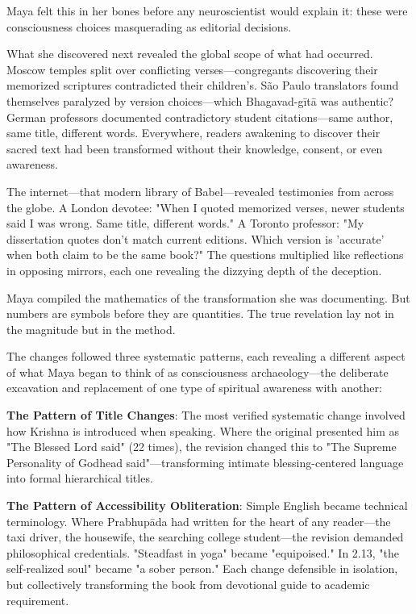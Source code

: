 \documentclass[12pt,twoside]{book}
\begin{document}
Maya felt this in her bones before any neuroscientist would explain it: these were consciousness choices masquerading as editorial decisions.

What she discovered next revealed the global scope of what had occurred. Moscow temples split over conflicting verses—congregants discovering their memorized scriptures contradicted their children's. São Paulo translators found themselves paralyzed by version choices—which Bhagavad-gītā was authentic? German professors documented contradictory student citations—same author, same title, different words. Everywhere, readers awakening to discover their sacred text had been transformed without their knowledge, consent, or even awareness.

The internet—that modern library of Babel—revealed testimonies from across the globe. A London devotee: "When I quoted memorized verses, newer students said I was wrong. Same title, different words." A Toronto professor: "My dissertation quotes don't match current editions. Which version is 'accurate' when both claim to be the same book?" The questions multiplied like reflections in opposing mirrors, each one revealing the dizzying depth of the deception.

Maya compiled the mathematics of the transformation she was documenting. But numbers are symbols before they are quantities. The true revelation lay not in the magnitude but in the method.

The changes followed three systematic patterns, each revealing a different aspect of what Maya began to think of as consciousness archaeology—the deliberate excavation and replacement of one type of spiritual awareness with another:

\textbf{\textbf{The Pattern of Title Changes}}: The most verified systematic change involved how Krishna is introduced when speaking. Where the original presented him as "The Blessed Lord said" (22 times), the revision changed this to "The Supreme Personality of Godhead said"—transforming intimate blessing-centered language into formal hierarchical titles.

\textbf{\textbf{The Pattern of Accessibility Obliteration}}: Simple English became technical terminology. Where Prabhupāda had written for the heart of any reader—the taxi driver, the housewife, the searching college student—the revision demanded philosophical credentials. "Steadfast in yoga" became "equipoised." In 2.13, "the self-realized soul" became "a sober person." Each change defensible in isolation, but collectively transforming the book from devotional guide to academic requirement.
\end{document}
